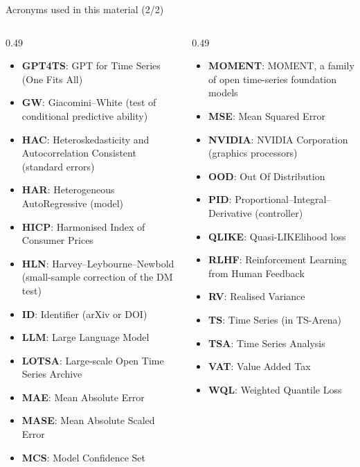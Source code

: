 \begin{frame}{Acronyms used in this material (2/2)}
\begin{columns}[T]
\begin{column}{0.49\textwidth}
\begin{itemize}\setlength{\itemsep}{0pt}
    \item \textbf{GPT4TS}: GPT for Time Series (One Fits All)
    \item \textbf{GW}: Giacomini–White (test of conditional predictive ability)
    \item \textbf{HAC}: Heteroskedasticity and Autocorrelation Consistent (standard errors)
    \item \textbf{HAR}: Heterogeneous AutoRegressive (model)
    \item \textbf{HICP}: Harmonised Index of Consumer Prices
    \item \textbf{HLN}: Harvey–Leybourne–Newbold (small-sample correction of the DM test)
    \item \textbf{ID}: Identifier (arXiv or DOI)
    \item \textbf{LLM}: Large Language Model
    \item \textbf{LOTSA}: Large-scale Open Time Series Archive
    \item \textbf{MAE}: Mean Absolute Error
    \item \textbf{MASE}: Mean Absolute Scaled Error
    \item \textbf{MCS}: Model Confidence Set
\end{itemize}
\end{column}
\begin{column}{0.49\textwidth}
\begin{itemize}\setlength{\itemsep}{0pt}
    \item \textbf{MOMENT}: MOMENT, a family of open time-series foundation models
    \item \textbf{MSE}: Mean Squared Error
    \item \textbf{NVIDIA}: NVIDIA Corporation (graphics processors)
    \item \textbf{OOD}: Out Of Distribution
    \item \textbf{PID}: Proportional--Integral--Derivative (controller)
    \item \textbf{QLIKE}: Quasi-LIKElihood loss
    \item \textbf{RLHF}: Reinforcement Learning from Human Feedback
    \item \textbf{RV}: Realised Variance
    \item \textbf{TS}: Time Series (in TS-Arena)
    \item \textbf{TSA}: Time Series Analysis
    \item \textbf{VAT}: Value Added Tax
    \item \textbf{WQL}: Weighted Quantile Loss
\end{itemize}
\end{column}
\end{columns}
\end{frame}

